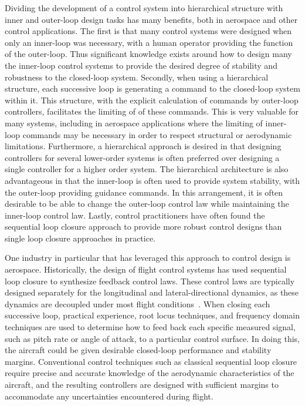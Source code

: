 Dividing the development of  a control system into hierarchical structure with inner and outer-loop design tasks has many benefits, both in aerospace and other control applications.
The first is that many control systems were designed when only an inner-loop was necessary, with a human operator providing the function of the outer-loop.
Thus significant knowledge exists around how to design many the inner-loop control systems to provide the desired degree of stability and robustness to the closed-loop system.
Secondly, when using a hierarchical structure, each successive loop is generating a command to the closed-loop system within it.
This structure, with the explicit calculation of commands by outer-loop controllers, facilitates the limiting of of these commands.
This is very valuable for many systems, including in aerospace applications where the limiting of inner-loop commands may be necessary in order to respect structural or aerodynamic limitations.
Furthermore, a hierarchical approach is desired in that designing controllers for several lower-order systems is often preferred over designing a single controller for a higher order system.
The hierarchical architecture is also advantageous in that the inner-loop is often used to provide system stability, with the outer-loop providing guidance commands.
In this arrangement, it is often desirable to be able to change the outer-loop control law while maintaining the inner-loop control law.
Lastly, control practitioners have often found the sequential loop closure approach to provide more robust control designs than single loop closure approaches in practice.

One industry in particular that has leveraged this approach to control design is aerospace.
Historically, the design of flight control systems has used sequential loop closure to synthesize feedback control laws.
These control laws are typically designed separately for the longitudinal and lateral-directional dynamics, as these dynamics are decoupled under most flight conditions\ \cite{stevenslewis.aircraftcontrol.2003}.
When closing each successive loop, practical experience, root locus techniques, and frequency domain techniques are used to determine how to feed back each specific measured signal, such as pitch rate or angle of attack, to a particular control surface.
In doing this, the aircraft could be given desirable closed-loop performance and stability margins.
Conventional control techniques such as classical sequential loop closure require precise and accurate knowledge of the aerodynamic characteristics of the aircraft, and the resulting controllers are designed with sufficient margins to accommodate any uncertainties encountered during flight.

